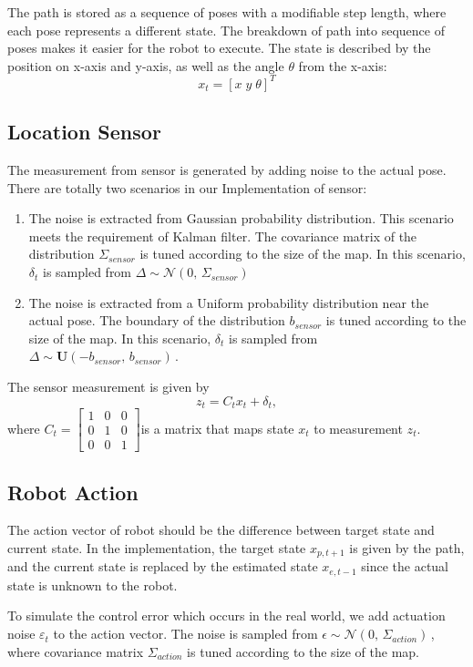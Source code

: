 \documentclass[letterpaper,11pt]{article}
\begin{document}
The path is stored as a sequence of poses with a modifiable step length, where each pose represents a different state. The breakdown of path into sequence of poses makes it easier for the robot to execute. The state is described by the position on x-axis and y-axis, as well as the angle $\theta$ from the x-axis:
$$x_t = [x\; y\; \theta]^T$$

\subsection{Location Sensor}
The measurement from sensor is generated by adding noise to the actual pose. There are totally two scenarios in our Implementation of sensor:

\begin{enumerate}
	\item The noise is extracted from Gaussian probability distribution. This scenario meets the requirement of Kalman filter. The covariance matrix of the distribution $\Sigma_{sensor}$ is tuned according to the size of the map. In this scenario, $\delta_t$ is sampled from $\Delta \sim \mathcal{N}(0,\,\Sigma_{sensor})\,$
	\item The noise is extracted from a Uniform probability distribution near the actual pose. The boundary of the distribution $b_{sensor}$ is tuned according to the size of the map. In this scenario, $\delta_t$ is sampled from $\Delta \sim \mathbf{U}(-b_{sensor},\,b_{sensor})\,$.
\end{enumerate}

The sensor measurement is given by
	$$z_t = C_t x_t + \delta_t,$$
	where $C_t = \begin{bmatrix}
		1 & 0 & 0\\
		0 & 1 & 0\\
		0 & 0 & 1
	   \end{bmatrix}$is a matrix that maps state $x_t$ to measurement $z_t$.

\subsection{Robot Action}
The action vector of robot should be the difference between target state and current state. In the implementation, the target state $x_{p,t+1}$ is given by the path, and the current state is replaced by the estimated state $x_{e,t-1}$ since the actual state is unknown to the robot.

To simulate the control error which occurs in the real world, we add actuation noise $\varepsilon_t$ to the action vector. The noise is sampled from $\epsilon \sim \mathcal{N}(0,\,\Sigma_{action})\,$, where covariance matrix $\Sigma_{action}$ is tuned according to the size of the map.
\end{document}
